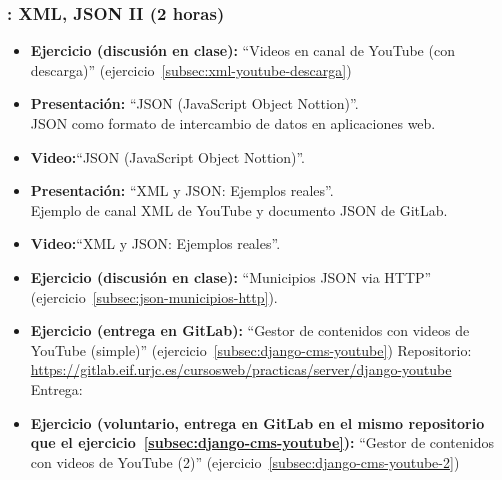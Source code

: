\documentclass[a4paper,12pt]{article}
\begin{document}
\subsubsection{\martesJ: XML, JSON II (2 horas)}
\label{cal:martesJ}

\begin{itemize}
\item \textbf{Ejercicio (discusión en clase):} ``Videos en canal de YouTube (con descarga)'' (ejercicio~\ref{subsec:xml-youtube-descarga})
\item \textbf{Presentación:} ``JSON (JavaScript Object Nottion)''. \\
  JSON como formato de intercambio de datos en aplicaciones web.
\item \textbf{Video:}``JSON (JavaScript Object Nottion)''.
\item \textbf{Presentación:} ``XML y JSON: Ejemplos reales''. \\
  Ejemplo de canal XML de YouTube y documento JSON de GitLab.
\item \textbf{Video:}``XML y JSON: Ejemplos reales''.
\item \textbf{Ejercicio (discusión en clase):} ``Municipios JSON via HTTP'' (ejercicio~\ref{subsec:json-municipios-http}).
\item \textbf{Ejercicio (entrega en GitLab):} ``Gestor de contenidos con videos de YouTube (simple)'' (ejercicio~\ref{subsec:django-cms-youtube})
  Repositorio: \url{https://gitlab.eif.urjc.es/cursosweb/practicas/server/django-youtube} \\
  Entrega: \martesL
\item \textbf{Ejercicio (voluntario, entrega en GitLab en el mismo repositorio que el ejercicio~\ref{subsec:django-cms-youtube}):} ``Gestor de contenidos con videos de YouTube (2)'' (ejercicio~\ref{subsec:django-cms-youtube-2}) \\
\end{itemize}

\end{document}
